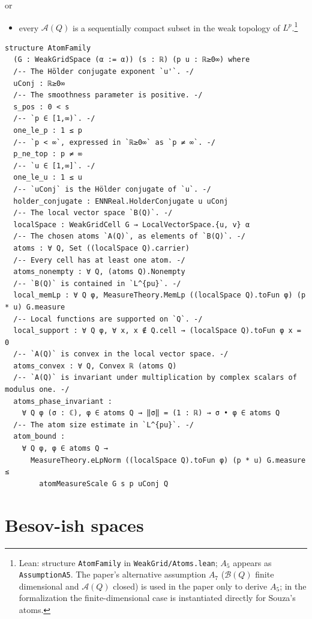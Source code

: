 \documentclass[11pt]{amsart}
\theoremstyle{definition}
\newcommand{\lean}[1]{\texttt{#1}}
\begin{document}
or
\begin{itemize}
\item[$A_6$.] every $\mathcal{A}(Q)$ is a sequentially compact subset in the
weak topology of $L^p$.\footnote{Lean: structure \lean{AtomFamily} in \lean{WeakGrid/Atoms.lean};
$A_5$ appears as \lean{AssumptionA5}. The paper's alternative assumption
$A_7$ ($\mathcal{B}(Q)$ finite dimensional and $\mathcal{A}(Q)$ closed) is
used in the paper only to derive $A_5$; in the formalization the
finite-dimensional case is instantiated directly for Souza's atoms.}
\end{itemize}
\begin{lstlisting}[style=lean,basicstyle=\ttfamily\scriptsize]
structure AtomFamily
  (G : WeakGridSpace (α := α)) (s : ℝ) (p u : ℝ≥0∞) where
  /-- The Hölder conjugate exponent `u'`. -/
  uConj : ℝ≥0∞
  /-- The smoothness parameter is positive. -/
  s_pos : 0 < s
  /-- `p ∈ [1,∞)`. -/
  one_le_p : 1 ≤ p
  /-- `p < ∞`, expressed in `ℝ≥0∞` as `p ≠ ∞`. -/
  p_ne_top : p ≠ ∞
  /-- `u ∈ [1,∞]`. -/
  one_le_u : 1 ≤ u
  /-- `uConj` is the Hölder conjugate of `u`. -/
  holder_conjugate : ENNReal.HolderConjugate u uConj
  /-- The local vector space `B(Q)`. -/
  localSpace : WeakGridCell G → LocalVectorSpace.{u, v} α
  /-- The chosen atoms `A(Q)`, as elements of `B(Q)`. -/
  atoms : ∀ Q, Set ((localSpace Q).carrier)
  /-- Every cell has at least one atom. -/
  atoms_nonempty : ∀ Q, (atoms Q).Nonempty
  /-- `B(Q)` is contained in `L^{pu}`. -/
  local_memLp : ∀ Q φ, MeasureTheory.MemLp ((localSpace Q).toFun φ) (p * u) G.measure
  /-- Local functions are supported on `Q`. -/
  local_support : ∀ Q φ, ∀ x, x ∉ Q.cell → (localSpace Q).toFun φ x = 0
  /-- `A(Q)` is convex in the local vector space. -/
  atoms_convex : ∀ Q, Convex ℝ (atoms Q)
  /-- `A(Q)` is invariant under multiplication by complex scalars of modulus one. -/
  atoms_phase_invariant :
    ∀ Q φ (σ : ℂ), φ ∈ atoms Q → ‖σ‖ = (1 : ℝ) → σ • φ ∈ atoms Q
  /-- The atom size estimate in `L^{pu}`. -/
  atom_bound :
    ∀ Q φ, φ ∈ atoms Q →
      MeasureTheory.eLpNorm ((localSpace Q).toFun φ) (p * u) G.measure ≤
        atomMeasureScale G s p uConj Q
\end{lstlisting}

\section{Besov-ish spaces}\label{besovish}
\end{document}
